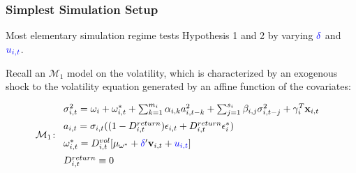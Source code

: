 \documentclass[9pt]{beamer}
\newcommand{\x}{\textbf{x}}
\def\mc#1{\mathcal{#1}} %
\def\mc#1{\mathcal{#1}}
\theoremstyle{definition}
\begin{document}

\begin{frame}
\fontsize{8pt}{9pt}

\frametitle{Simplest Simulation Setup}

Most elementary simulation regime tests Hypothesis 1 and 2 by varying $\textcolor{blue}{\delta}$ and $\textcolor{blue}{u_{i,t}}$.\\

\bigbreak

Recall an \hyperlink{model_1}{$\mc{M}_1$} model on the volatility, which is characterized by an exogenous shock to the volatility equation generated by an affine function of the covariates:

  \begin{align*}
    \mc{M}_1 \colon \begin{array}{l}
       \sigma^{2}_{i,t} = \omega_{i} + \omega^{*}_{i,t} + \sum^{m_{i}}_{k=1}\alpha_{i,k}a^{2}_{i,t-k} + \sum_{j=1}^{s_{i}}\beta_{i,j}\sigma_{i,t-j}^{2} + \gamma_{i}^{T} \x_{i,t} \text{ }\\[.2cm]
       a_{i,t} = \sigma_{i,t}((1-D^{return}_{i,t})\epsilon_{i,t} + D^{return}_{i,t}\epsilon^{*}_{i})\\[.2cm]
      \omega_{i,t}^{*} = D^{vol}_{i,t}[\mu_{\omega^{*}}+\textcolor{blue}{\delta}'\textbf{v}_{i, t}+ \textcolor{blue}{u_{i,t}}]\\[.2cm]
      D^{return}_{i,t} \equiv 0
    \end{array}
    \end{align*}

\end{frame}
\end{document}
